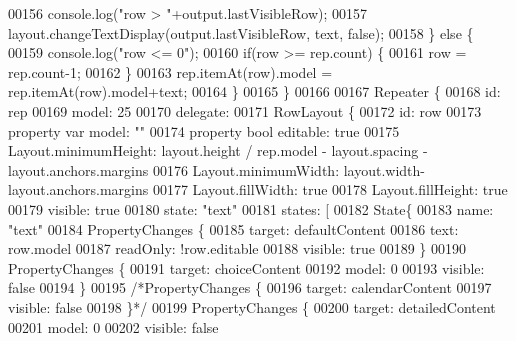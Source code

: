 \begin{DoxyCode}
00156                 console.log(\textcolor{stringliteral}{"row > "}+output.lastVisibleRow);
00157                 layout.changeTextDisplay(output.lastVisibleRow, text, \textcolor{keyword}{false});
00158             \} \textcolor{keywordflow}{else} \{
00159                 console.log(\textcolor{stringliteral}{"row <= 0"});
00160                 \textcolor{keywordflow}{if}(row >= rep.count) \{
00161                     row = rep.count-1;
00162                 \}
00163                 rep.itemAt(row).model = rep.itemAt(row).model+text;
00164             \}
00165         \}
00166 
00167         Repeater \{
00168             \textcolor{keywordtype}{id}: rep
00169             model: 25
00170             delegate:
00171                 RowLayout \{
00172                 \textcolor{keywordtype}{id}: row
00173                 \textcolor{keyword}{property} var model: \textcolor{stringliteral}{""}
00174                 \textcolor{keyword}{property} \textcolor{keywordtype}{bool} editable: \textcolor{keyword}{true}
00175                 Layout.minimumHeight: layout.height / rep.model - layout.spacing -layout.anchors.margins
00176                 Layout.minimumWidth: layout.width-layout.anchors.margins
00177                 Layout.fillWidth: \textcolor{keyword}{true}
00178                 Layout.fillHeight: \textcolor{keyword}{true}
00179                 visible: \textcolor{keyword}{true}
00180                 state: \textcolor{stringliteral}{"text"}
00181                 states: [
00182                     State\{
00183                         name: \textcolor{stringliteral}{"text"}
00184                         PropertyChanges \{
00185                             target: defaultContent
00186                             text: row.model
00187                             readOnly:  !row.editable
00188                             visible: \textcolor{keyword}{true}
00189                         \}
00190                         PropertyChanges \{
00191                             target: choiceContent
00192                             model: 0
00193                             visible: \textcolor{keyword}{false}
00194                         \}
00195                         \textcolor{comment}{/*PropertyChanges \{}
00196 \textcolor{comment}{                            target: calendarContent}
00197 \textcolor{comment}{                            visible: false}
00198 \textcolor{comment}{                        \}*/}
00199                         PropertyChanges \{
00200                             target: detailedContent
00201                             model: 0
00202                             visible: \textcolor{keyword}{false}

\end{DoxyCode}
